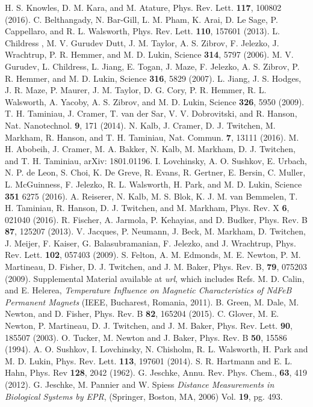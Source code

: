 \documentclass[%
 reprint,
 amsmath,amssymb,
 aps,
]{revtex4-1}
\begin{document}
\begin{thebibliography}{9}
H. S. Knowles, D. M. Kara, and M. Atature, Phys. Rev. Lett. \textbf{117}, 100802 (2016).
 C. Belthangady, N. Bar-Gill, L. M. Pham, K. Arai, D. Le Sage, P. Cappellaro, and R. L. Walsworth, Phys. Rev. Lett. \textbf{110}, 157601 (2013).
 L. Childress , M. V. Gurudev Dutt, J. M. Taylor, A. S. Zibrov, F. Jelezko, J. Wrachtrup, P. R. Hemmer, and M. D. Lukin, Science \textbf{314}, 5797 (2006).
 M. V. Gurudev, L. Childress, L. Jiang, E. Togan, J. Maze, F. Jelezko, A. S. Zibrov, P. R. Hemmer, and M. D. Lukin, Science \textbf{316}, 5829 (2007).
 L. Jiang, J. S. Hodges, J. R. Maze, P. Maurer, J. M. Taylor, D. G. Cory, P. R. Hemmer, R. L. Walsworth, A. Yacoby, A. S. Zibrov, and M. D. Lukin, Science \textbf{326}, 5950 (2009).
 T. H. Taminiau, J. Cramer, T. van der Sar, V. V. Dobrovitski, and R. Hanson, Nat. Nanotechnol. \textbf{9}, 171 (2014).
 N. Kalb, J. Cramer, D. J. Twitchen, M. Markham, R. Hanson, and T. H. Taminiau, Nat. Commun. \textbf{7}, 13111 (2016).
 M. H. Abobeih, J. Cramer, M. A. Bakker, N. Kalb, M. Markham, D. J. Twitchen, and T. H. Taminiau, arXiv: 1801.01196.
 I. Lovchinsky, A. O. Sushkov, E. Urbach, N. P. de Leon, S. Choi, K. De Greve, R. Evans, R. Gertner, E. Bersin, C. Muller, L. McGuinness, F. Jelezko, R. L. Walsworth, H. Park, and M. D. Lukin, Science \textbf{351} 6275 (2016).
 A. Reiserer, N. Kalb, M. S. Blok, K. J. M. van Bemmelen, T. H. Taminiau, R. Hanson, D. J. Twitchen, and M. Markham, Phys. Rev. X \textbf{6}, 021040 (2016).
 R. Fischer, A. Jarmola, P. Kehayias, and D. Budker, Phys. Rev. B \textbf{87}, 125207 (2013).
 V. Jacques, P. Neumann, J. Beck, M. Markham, D. Twitchen, J. Meijer, F. Kaiser, G. Balasubramanian, F. Jelezko, and J. Wrachtrup, Phys. Rev. Lett. \textbf{102}, 057403 (2009).
 S. Felton, A. M. Edmonds, M. E. Newton, P. M. Martineau, D. Fisher, D. J. Twitchen, and J. M. Baker, Phys. Rev. B, \textbf{79}, 075203 (2009).
 Supplemental Material available at \textit{url}, which includes Refs. \cite{tempco,newton paper 1,newton paper 2,baker paper,alex single proton}
 M. D. Calin, and E. Helerea, \textit{Temperature Influence on Magnetic
Characteristics of NdFeB Permanent Magnets} (IEEE, Bucharest, Romania, 2011).
 B. Green, M. Dale, M. Newton, and D. Fisher, Phys. Rev. B \textbf{82}, 165204 (2015).
 C. Glover, M. E. Newton, P. Martineau, D. J. Twitchen, and J. M. Baker, Phys. Rev. Lett. \textbf{90}, 185507 (2003).
 O. Tucker, M. Newton and J. Baker, Phys. Rev. B \textbf{50}, 15586 (1994).
 A. O. Sushkov, I. Lovchinsky, N. Chisholm, R. L. Walsworth, H. Park and M. D. Lukin, Phys. Rev. Lett. \textbf{113}, 197601 (2014).
 S. R. Hartmann and E. L. Hahn, Phys. Rev \textbf{128}, 2042 (1962).
 G. Jeschke, Annu. Rev. Phys. Chem., \textbf{63}, 419 (2012).
 G. Jeschke, M. Pannier and W. Spiess \textit{Distance Measurements in Biological Systems by EPR}, (Springer, Boston, MA, 2006) Vol. \textbf{19}, pg. 493.



\end{thebibliography}
\end{document}
